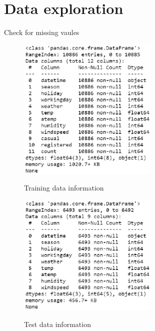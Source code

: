 \documentclass[
 size=14pt,
 paper=smartboard,  %
 mode=present, 		%
 display=slides, 	%
 style=tuliplab,  	%
 pauseslide,
 fleqn,leqno]{powerdot}
\begin{document}

\section{Data exploration}



\begin{slide}{Check for missing vaules }



\twocolumn
{
\vspace{0.75cm}
\begin{figure}
  \centering
  \includegraphics[width=0.6\textwidth]{figures//train_info.eps}\\
  \caption{Training data information}\label{fig:GroupOutAspect-target}
\end{figure}
}
{



\bigskip
\bigskip

\begin{figure}
  \centering
  \includegraphics[width=0.6\textwidth]{figures//test_info.eps}\\
  \bigskip
  \caption{Test data information}\label{fig:OutAspect-target}
\end{figure}
}


\end{slide}
\end{document}
